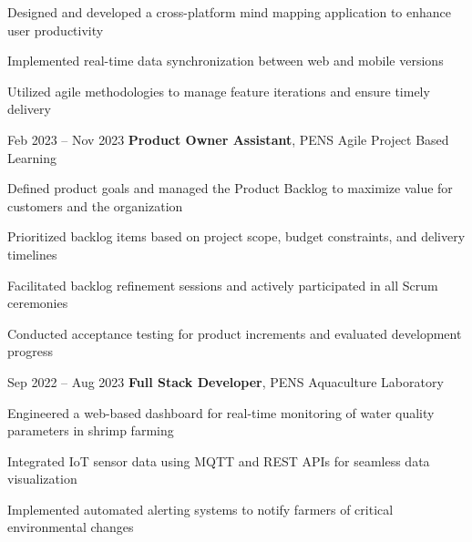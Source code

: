 \vspace{0.10 cm}
\begin{onecolentry}
	\begin{highlights}
		\item Designed and developed a cross-platform mind mapping application to enhance user productivity
		\item Implemented real-time data synchronization between web and mobile versions
		\item Utilized agile methodologies to manage feature iterations and ensure timely delivery
	\end{highlights}
\end{onecolentry}

\vspace{0.5 cm}

\begin{twocolentrydate}{Feb 2023 -- Nov 2023}
	\textbf{Product Owner Assistant}, PENS Agile Project Based Learning
\end{twocolentrydate}

\vspace{0.10 cm}
\begin{onecolentry}
	\begin{highlights}
		\item Defined product goals and managed the Product Backlog to maximize value for customers and the organization
		\item Prioritized backlog items based on project scope, budget constraints, and delivery timelines
		\item Facilitated backlog refinement sessions and actively participated in all Scrum ceremonies
		\item Conducted acceptance testing for product increments and evaluated development progress
	\end{highlights}
\end{onecolentry}

\vspace{0.5 cm}

\begin{twocolentrydate}{Sep 2022 -- Aug 2023}
	\textbf{Full Stack Developer}, PENS Aquaculture Laboratory
\end{twocolentrydate}

\vspace{0.10 cm}
\begin{onecolentry}
	\begin{highlights}
		\item Engineered a web-based dashboard for real-time monitoring of water quality parameters in shrimp farming
		\item Integrated IoT sensor data using MQTT and REST APIs for seamless data visualization
		\item Implemented automated alerting systems to notify farmers of critical environmental changes
	\end{highlights}
\end{onecolentry}

